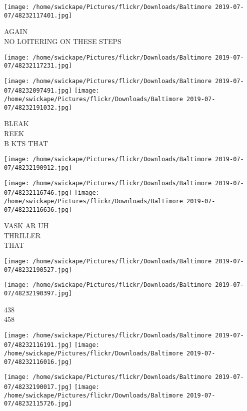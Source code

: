 \documentclass[10pt,letterpaper]{article}
\begin{document}
\vspace{0.25in}
\texttt{[image: /home/swickape/Pictures/flickr/Downloads/Baltimore 2019-07-07/48232117401.jpg]}

AGAIN\\
NO LOITERING ON THESE STEPS
\pagebreak

\texttt{[image: /home/swickape/Pictures/flickr/Downloads/Baltimore 2019-07-07/48232117231.jpg]}

\vspace{0.25in}
\texttt{[image: /home/swickape/Pictures/flickr/Downloads/Baltimore 2019-07-07/48232097491.jpg]}
\texttt{[image: /home/swickape/Pictures/flickr/Downloads/Baltimore 2019-07-07/48232191032.jpg]}

BLEAK\\
REEK\\
B KTS THAT
\pagebreak

\texttt{[image: /home/swickape/Pictures/flickr/Downloads/Baltimore 2019-07-07/48232190912.jpg]}

\vspace{0.25in}
\texttt{[image: /home/swickape/Pictures/flickr/Downloads/Baltimore 2019-07-07/48232116746.jpg]}
\texttt{[image: /home/swickape/Pictures/flickr/Downloads/Baltimore 2019-07-07/48232116636.jpg]}

VASK AR UH\\
THRILLER\\
THAT
\pagebreak

\texttt{[image: /home/swickape/Pictures/flickr/Downloads/Baltimore 2019-07-07/48232190527.jpg]}

\vspace{0.25in}
\texttt{[image: /home/swickape/Pictures/flickr/Downloads/Baltimore 2019-07-07/48232190397.jpg]}

438\\
458
\pagebreak

\texttt{[image: /home/swickape/Pictures/flickr/Downloads/Baltimore 2019-07-07/48232116191.jpg]}
\texttt{[image: /home/swickape/Pictures/flickr/Downloads/Baltimore 2019-07-07/48232116016.jpg]}

\texttt{[image: /home/swickape/Pictures/flickr/Downloads/Baltimore 2019-07-07/48232190017.jpg]}
\texttt{[image: /home/swickape/Pictures/flickr/Downloads/Baltimore 2019-07-07/48232115726.jpg]}
\end{document}
